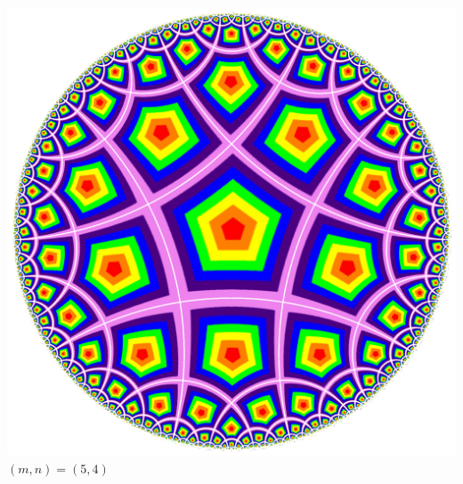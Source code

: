 \begin{minipage}[t]{0.45\linewidth}
\includegraphics[scale=0.112]{tiling}\\
$(m,n)=(5,4)$
\end{minipage}\goodbreak



